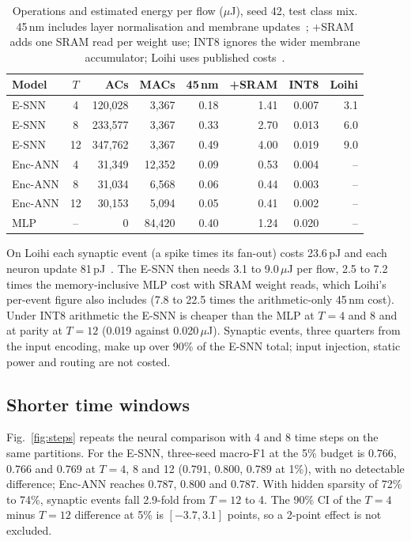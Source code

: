 \documentclass[conference]{IEEEtran}
\begin{document}
\begin{table}[t]
\centering
\caption{Operations and estimated energy per flow ($\mu$J), seed 42, test class mix. 45\,nm includes layer normalisation and membrane updates~\cite{horowitz2014}; +SRAM adds one SRAM read per weight use; INT8 ignores the wider membrane accumulator; Loihi uses published costs~\cite{davies2018}.}
\label{tab:loihi}
\small
\setlength{\tabcolsep}{2pt}
\begin{tabular}{lcrrrrrr}
\toprule
Model & $T$ & ACs & MACs & 45\,nm & +SRAM & INT8 & Loihi \\
\midrule
E-SNN & 4 & 120{,}028 & 3{,}367 & 0.18 & 1.41 & 0.007 & 3.1 \\
E-SNN & 8 & 233{,}577 & 3{,}367 & 0.33 & 2.70 & 0.013 & 6.0 \\
E-SNN & 12 & 347{,}762 & 3{,}367 & 0.49 & 4.00 & 0.019 & 9.0 \\
Enc-ANN & 4 & 31{,}349 & 12{,}352 & 0.09 & 0.53 & 0.004 & -- \\
Enc-ANN & 8 & 31{,}034 & 6{,}568 & 0.06 & 0.44 & 0.003 & -- \\
Enc-ANN & 12 & 30{,}153 & 5{,}094 & 0.05 & 0.41 & 0.002 & -- \\
MLP & -- & 0 & 84{,}420 & 0.40 & 1.24 & 0.020 & -- \\
\bottomrule
\end{tabular}
\end{table}

On Loihi each synaptic event (a spike times its fan-out) costs 23.6\,pJ and each neuron update 81\,pJ~\cite{davies2018}. The E-SNN then needs 3.1 to 9.0\,$\mu$J per flow, 2.5 to 7.2 times the memory-inclusive MLP cost with SRAM weight reads, which Loihi's per-event figure also includes (7.8 to 22.5 times the arithmetic-only 45\,nm cost). Under INT8 arithmetic the E-SNN is cheaper than the MLP at $T = 4$ and 8 and at parity at $T = 12$ (0.019 against 0.020\,$\mu$J). Synaptic events, three quarters from the input encoding, make up over 90\% of the E-SNN total; input injection, static power and routing are not costed.

\subsection{Shorter time windows}

Fig.~\ref{fig:steps} repeats the neural comparison with 4 and 8 time steps on the same partitions. For the E-SNN, three-seed macro-F1 at the 5\% budget is $0.766$, $0.766$ and $0.769$ at $T = 4$, 8 and 12 ($0.791$, $0.800$, $0.789$ at 1\%), with no detectable difference; Enc-ANN reaches $0.787$, $0.800$ and $0.787$. With hidden sparsity of 72\% to 74\%, synaptic events fall 2.9-fold from $T = 12$ to 4. The 90\% CI of the $T = 4$ minus $T = 12$ difference at 5\% is $[-3.7, 3.1]$ points, so a 2-point effect is not excluded.
\end{document}
